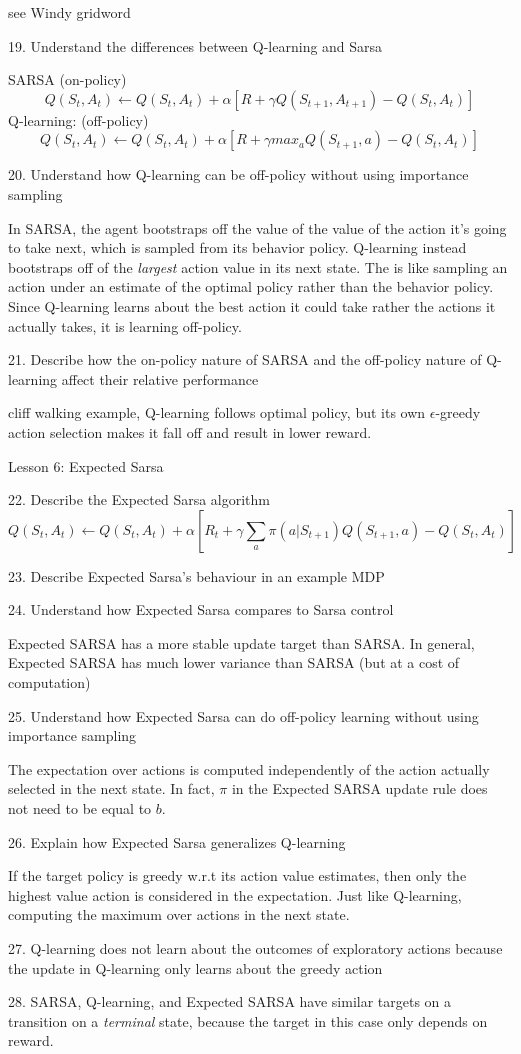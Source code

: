 \documentclass[sutton_barto_notes.tex]{subfiles}
\begin{document}
see Windy gridword

19. Understand the differences between Q-learning and Sarsa

SARSA (on-policy)
$$ Q(S_t, A_t) \leftarrow Q(S_t, A_t) + \alpha [ R + \gamma Q( S_{t+1}, A_{t+1}) - Q(S_t, A_t)]$$
Q-learning: (off-policy)
$$Q(S_t,A_t)\leftarrow Q(S_t, A_t)+\alpha [R + \gamma max_a Q(S_{t+1}, a) - Q(S_t, A_t)]$$

20. Understand how Q-learning can be off-policy without using importance sampling

In SARSA, the agent bootstraps off the value of the value of the action it's going to take next, which is sampled from its behavior policy. Q-learning instead bootstraps off of the \textit{largest} action value in its next state. The is like sampling an action under an estimate of the optimal policy rather than the behavior policy. Since Q-learning learns about the best action it could take rather the actions it actually takes, it is learning off-policy.

21. Describe how the on-policy nature of SARSA and the off-policy nature of Q-learning affect their relative performance

cliff walking example, Q-learning follows optimal policy, but its own $\epsilon$-greedy action selection makes it fall off and result in lower reward.

Lesson 6: Expected Sarsa

22. Describe the Expected Sarsa algorithm
$$Q(S_t, A_t)\leftarrow Q(S_t, A_t) + \alpha [R_t + \gamma \sum_a \pi(a|S_{t+1})Q(S_{t+1},a) - Q(S_t, A_t)]$$

23. Describe Expected Sarsa’s behaviour in an example MDP

24. Understand how Expected Sarsa compares to Sarsa control

Expected SARSA has a more stable update target than SARSA. In general, Expected SARSA has much lower variance than SARSA (but at a cost of computation)

25. Understand how Expected Sarsa can do off-policy learning without using importance sampling

The expectation over actions is computed independently of the action actually selected in the next state. In fact, $\pi$ in the Expected SARSA update rule does not need to be equal to $b$.

26. Explain how Expected Sarsa generalizes Q-learning

If the target policy is greedy w.r.t its action value estimates, then only the highest value action is considered in the expectation. Just like Q-learning, computing the maximum over actions in the next state.

27. Q-learning does not learn about the outcomes of exploratory actions because the update in Q-learning only learns about the greedy action

28. SARSA, Q-learning, and Expected SARSA have similar targets on a transition on a \textit{terminal} state, because the target in this case only depends on reward.
\end{document}
